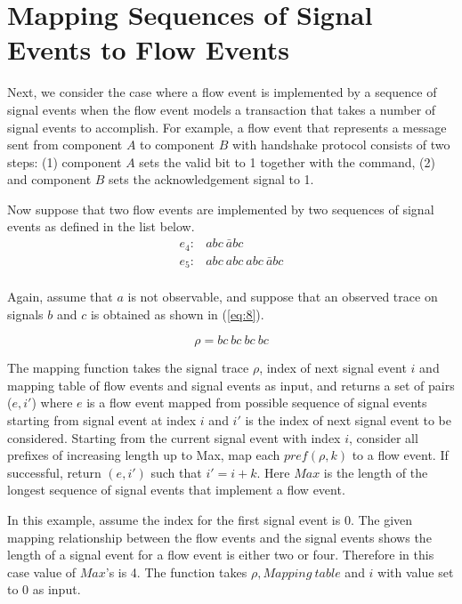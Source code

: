 \documentclass[12pt,frontmatter,copyright,thesis]{usfmanus}
\begin{document}
\section{Mapping Sequences of Signal Events to Flow Events}
Next, we consider the case where a flow event is implemented by
a sequence of signal events
when the flow event models a transaction that
takes a number of signal events to accomplish. For example,
a flow event that represents a message sent from component
$A$ to component $B$ with handshake protocol consists
of two steps: (1) component $A$ sets the valid bit to 1 together with
the command,
(2) and component $B$ sets the acknowledgement
signal to 1.

Now suppose that two
flow events are implemented by two sequences of signal events as
defined in the list below.
\[
\begin{array}{cl}
e_4: & abc\ \bar{a}bc\\
e_5: & abc\ abc\ abc\ \bar{a}bc\\
\end{array}
\] 

Again, assume that $a$ is not observable, and suppose that an observed trace
on signals $b$ and $c$ is obtained as shown in (\ref{eq:8}).

\begin{equation}
\label{eq:8}
\rho=bc\ bc\ bc \ bc
\end{equation}



The mapping function takes the signal trace $\rho$, index of next signal event $i$
and mapping table of flow events and signal events as
input, and returns a set of pairs ($e,i'$) where
$e$ is a flow event mapped from possible sequence of signal events
starting from signal event at index $i$ and $i'$ is
the index of next signal event to be considered.
Starting from the current signal event with index $i$, consider all prefixes of
increasing length up to Max, map each $pref(\rho,k)$ to
a flow event.
If successful, return $(e,i')$ such that $i'=i+k$.
Here $Max$ is the length of the longest sequence of signal events that implement a flow event.


In this example, assume the index for the first signal event is 0. 
The given mapping relationship between the flow events and the signal events shows
the length of a signal event for a flow event is either two or four. Therefore in this case
value of $Max$'s is 4.
The function takes $\rho, Mapping\ table$ and $i$ with value set to 0 as input.
\end{document}

